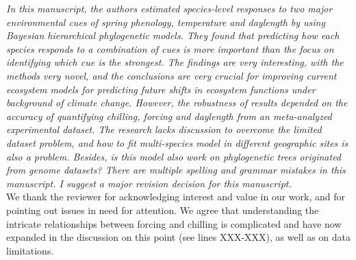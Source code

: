 \documentclass[11pt]{article}
\begin{document}
\emph{In this manuscript, the authors estimated species-level responses to two major environmental cues of spring phenology, temperature and daylength by using Bayesian hierarchical phylogenetic models. They found that predicting how each species responds to a combination of cues is more important than the focus on identifying which cue is the strongest. The findings are very interesting, with the methods very novel, and the conclusions are very crucial for improving current ecosystem models for predicting future shifts in ecosystem functions under background of climate change. However, the robustness of results depended on the accuracy of quantifying chilling, forcing and daylength from an meta-analyzed experimental dataset. The research lacks discussion to overcome the limited dataset problem, and how to fit multi-species model in different geographic sites is also a problem. Besides, is this model also work on phylogenetic trees originated from genome datasets? There are multiple spelling and grammar mistakes in this manuscript. I suggest a major revision decision for this manuscript.}\\


We thank the reviewer for acknowledging interest and value in our work, and for pointing out issues in need for attention. We agree that understanding the intricate relationships between forcing and chilling is complicated and have now expanded in the discussion on this point (see lines XXX-XXX), as well as on data limitations.\\ 
\end{document}
